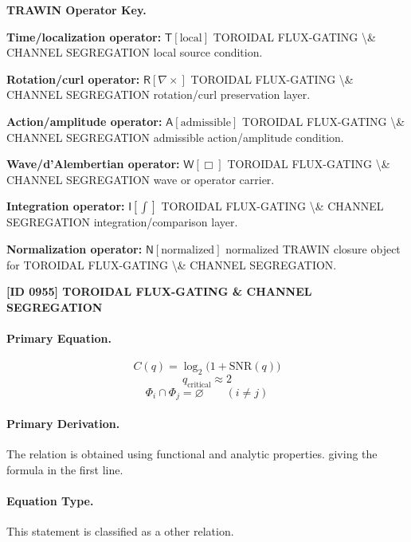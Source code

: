 \par\vspace{0.45\baselineskip}
\noindent\begin{minipage}[t]{\linewidth}
\begingroup
\small
\raggedright
\textbf{TRAWIN Operator Key.}\par
\noindent\textbf{Time/localization operator:} $\mathsf{T}\!\left[\mathrm{local}\right]$ TOROIDAL FLUX-GATING \textbackslash{}\& CHANNEL SEGREGATION local source condition.\par
\noindent\textbf{Rotation/curl operator:} $\mathsf{R}\!\left[\nabla\times\right]$ TOROIDAL FLUX-GATING \textbackslash{}\& CHANNEL SEGREGATION rotation/curl preservation layer.\par
\noindent\textbf{Action/amplitude operator:} $\mathsf{A}\!\left[\mathrm{admissible}\right]$ TOROIDAL FLUX-GATING \textbackslash{}\& CHANNEL SEGREGATION admissible action/amplitude condition.\par
\noindent\textbf{Wave/d'Alembertian operator:} $\mathsf{W}\!\left[\Box\right]$ TOROIDAL FLUX-GATING \textbackslash{}\& CHANNEL SEGREGATION wave or operator carrier.\par
\noindent\textbf{Integration operator:} $\mathsf{I}\!\left[\int\right]$ TOROIDAL FLUX-GATING \textbackslash{}\& CHANNEL SEGREGATION integration/comparison layer.\par
\noindent\textbf{Normalization operator:} $\mathsf{N}\!\left[\mathrm{normalized}\right]$ normalized TRAWIN closure object for TOROIDAL FLUX-GATING \textbackslash{}\& CHANNEL SEGREGATION.\par
\endgroup
\end{minipage}

\clearpage
\noindent\textbf{[ID 0955] TOROIDAL FLUX-GATING \& CHANNEL SEGREGATION}\par
\vspace{0.35em}
\paragraph{Primary Equation.}
\[
C(q)=\log_2\!\bigl(1+\mathrm{SNR}(q)\bigr)
\]
\[
q_{\mathrm{critical}}\approx 2
\]
\[
\Phi_i\cap\Phi_j=\varnothing\qquad(i\neq j)
\]

\paragraph{Primary Derivation.}
The relation is obtained using functional and analytic properties. giving the formula in the first line.
\paragraph{Equation Type.}
This statement is classified as a other relation.


